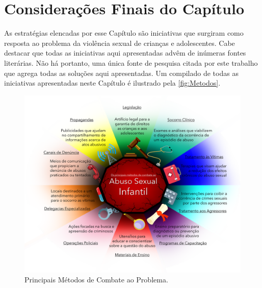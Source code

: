 


\section{Considerações Finais do Capítulo}\label{sec:finais}


As estratégias elencadas por esse Capítulo são iniciativas que surgiram como resposta ao problema da violência sexual de crianças e adolescentes. Cabe destacar que todas as iniciativas aqui apresentadas advêm de inúmeras fontes literárias. Não há portanto, uma única fonte de pesquisa citada por este trabalho que agrega todas as soluções aqui apresentadas. Um compilado de todas as iniciativas apresentadas neste Capítulo é ilustrado pela \autoref{fig:Metodos}.


\vspace{1.0cm}

\begin{figure}[htb]
  
	\caption{\label{fig:Metodos}Principais Métodos de Combate ao Problema.}\vspace{-0.2cm}
  \begin{adjustwidth}{-2.0cm}{-0.0cm}
    \includegraphics[scale=0.55]{./Figuras/MétodosCombate.pdf}
	\end{adjustwidth}\vspace{-0.5cm}

\end{figure}

